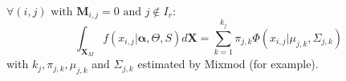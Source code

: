 \documentclass[11pt,a4paper]{report}
\begin{document}
	  $\forall (i,j) \textrm{ with } \boldsymbol{M}_{i,j}= 0 \textrm{ and } j \notin I_r $:
	 \begin{equation}
	 \int_{\boldsymbol{X}_M}f(x_{i,j}|\boldsymbol{\alpha},\Theta,S) d\boldsymbol{X}=\sum_{k=1}^{k_j}\pi_{j,k}\Phi(x_{i,j}|\mu_{j,k},\Sigma_{j,k})
	 \end{equation} with $k_j,\pi_{j,k}, \mu_{j,k}$ and $\Sigma_{j,k}$ estimated by Mixmod (for example). 
	 	
\end{document}

